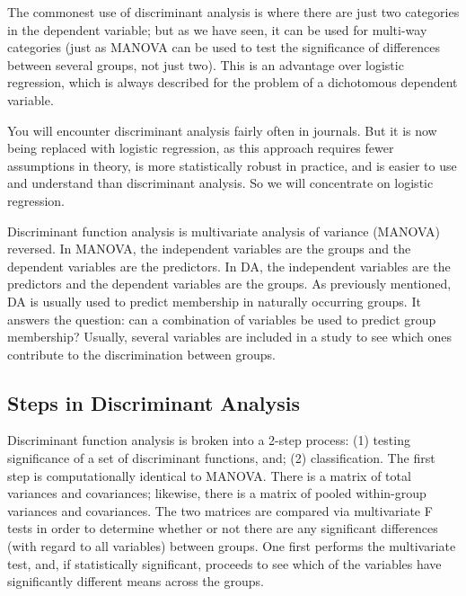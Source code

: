 The commonest use of discriminant analysis is where there are just two categories in the dependent variable; but as we have seen, it can be used for multi-way categories (just as MANOVA can be used to test the significance of differences between several groups, not just two). This is an advantage over logistic regression, which is always described for the problem of a dichotomous dependent variable.

You will encounter discriminant analysis fairly often in journals. But it is now being replaced with logistic regression, as this approach requires fewer assumptions in theory, is more statistically robust in practice, and is easier to use and understand than discriminant analysis. So we will concentrate on logistic regression.


Discriminant function analysis is multivariate analysis of variance (MANOVA)
reversed. In MANOVA, the independent variables are the groups and the
dependent variables are the predictors. In DA, the independent variables are the
predictors and the dependent variables are the groups. As previously
mentioned, DA is usually used to predict membership in naturally occurring
groups. It answers the question: can a combination of variables be used to
predict group membership? Usually, several variables are included in a study to
see which ones contribute to the discrimination between groups.

\subsection{Steps in Discriminant Analysis}
Discriminant function analysis is broken into a 2-step process: (1) testing
significance of a set of discriminant functions, and; (2) classification. The first
step is computationally identical to MANOVA. There is a matrix of total variances
and covariances; likewise, there is a matrix of pooled within-group variances and
covariances. The two matrices are compared via multivariate F tests in order to
determine whether or not there are any significant differences (with regard to all
variables) between groups. One first performs the multivariate test, and, if
statistically significant, proceeds to see which of the variables have significantly
different means across the groups.

